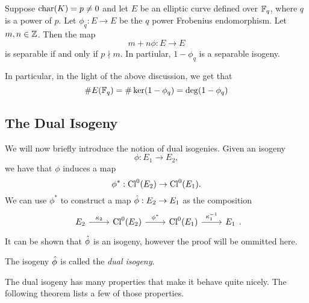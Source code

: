 \begin{proposition}
	\label{prop:frobenius-separable}
	Suppose $\operatorname{char}(K) = p \neq 0$ and
	let $E$ be an elliptic curve defined over
	$\mathbb{F}_q$, where $q$ is a power of $p$. 
	Let $\phi_q: E \to E$ be the
	$q$ power Frobenius endomorphism.
	Let $m, n \in \mathbb{Z}$.
	Then the map
	\begin{equation*}
		m + n\phi: E\to E
	\end{equation*}
	is separable if and only if $p\nmid m$.
	In partiular, $1 - \phi_q$ is a separable isogeny.
\end{proposition}

In particular, in the light of the above discussion, we get that
\begin{equation*}
	\#E(\mathbb{F}_q) = \#\ker(1 - \phi_q) = \deg(1 - \phi_q)
\end{equation*}

\subsection{The Dual Isogeny}

We will now briefly introduce the notion of dual isogenies. 
Given an isogeny
\begin{equation*}
	\phi: E_1 \to E_2,
\end{equation*}
we have that $\phi$ induces a map
\begin{equation*}
	\phi^*: \operatorname{Cl}^0(E_2) \to \operatorname{Cl}^0(E_1).
\end{equation*}
We can use $\phi^*$ to construct a map $\Hat\phi: E_2 \to E_1$
as the composition
\begin{equation*}
	\begin{tikzcd}
		{E_2} & {\Cl^0(E_2)} & {\Cl^0(E_1)} & {E_1}
		\arrow["{\kappa_2}", from=1-1, to=1-2]
		\arrow["{\phi^*}", from=1-2, to=1-3]
		\arrow["{\kappa_1^{-1}}", from=1-3, to=1-4]
	\end{tikzcd}.
\end{equation*}
It can be shown that $\Hat\phi$ is an isogeny, however the proof will be
ommitted here.

\begin{definition}
	The isogeny $\Hat\phi$ is called the \emph{dual isogeny}.
\end{definition}

The dual isogeny has many properties that make it behave quite nicely.
The following theorem lists a few of those properties.


